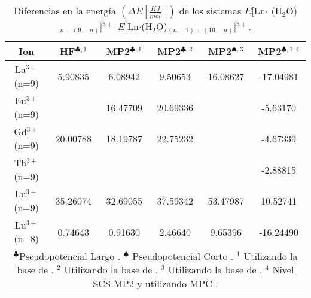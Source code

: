 \begin{table}[h!]
\centering
\caption{\footnotesize Diferencias en la energ\'ia $(\Delta E 
[\frac{KJ}{mol}])$ de los sistemas $E$[Ln$\cdot$
(H$_2$O)$_{n+(9-n)}$]$^{3+}$-$E$[Ln$\cdot$(H$_2$O)$_{(n-1)+(10-n)}$]$^{3+}$.}
\begin{tabular}{c|ccccc}\hline\hline
Ion & HF$^{\clubsuit,1}$ & MP2$^{\clubsuit,1}$ & MP2$^{\clubsuit,2}$ & 
MP2$^{\spadesuit,3}$ & MP2$^{\clubsuit,1,4}$     \\ \hline
La$^{3+}$(n=9) & 5.90835 & 6.08942 & 9.50653 & 16.08627 & 
-17.04981 \\ 
Eu$^{3+}$(n=9) &         &16.47709 &20.69336 &          &
 -5.63170 \\
Gd$^{3+}$(n=9) &20.00788 &18.19787 &22.75232 &          &
 -4.67339 \\ 
Tb$^{3+}$(n=9) &         &         &         &          &
 -2.88815 \\
Lu$^{3+}$(n=9) &35.26074 &32.69055 &37.59342 & 53.47987 &
 10.52741 \\ 
Lu$^{3+}$(n=8) & 0.74643 & 0.91630 & 2.46640 &  9.65396 &
-16.24490 \\ 
\hline 
\multicolumn{6}{p{11.0cm}}{
{\footnotesize $^\clubsuit$Pseudopotencial Largo \citep{Dolg1989}. 
$^\spadesuit$ Pseudopotencial Corto \citep{Cao2001}}.
{\footnotesize $^1$ Utilizando la base de \cite{Dolg1993}.} 
{\footnotesize $^2$ Utilizando la base de \cite{Yang2005}.}
{\footnotesize $^3$ Utilizando la base de \cite{Cao2002}.}  
{\footnotesize $^4$ Nivel SCS-MP2 \citep{Grim2003} y utilizando MPC 
\citep{Toma2005}.}}
\end{tabular}\label{tDE}\end{table}
